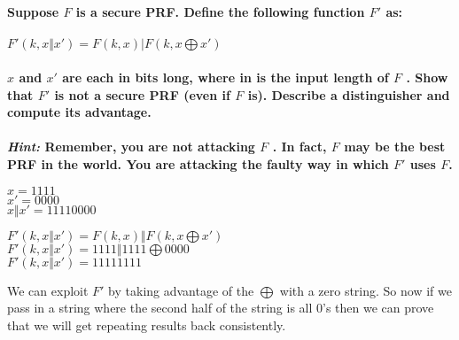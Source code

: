 \documentclass[letterpaper,12pt,notitlepage,fleqn]{article}
\begin{document}
\section{}
\textbf{Suppose $F$ is a secure PRF. Define the following function $F'$ as:\\ \\ $F'(k,x \Vert x')=F(k,x) \vert F(k,x \bigoplus x')$}\\\\
\textbf{$x$ and $x'$ are each in bits long, where in is the input length of $F$ . Show that $F'$ is \textbf{not} a secure PRF (even if $F$ is). Describe a distinguisher and compute its advantage.\\ \\
\textit{Hint:} Remember, you are not attacking $F$ . In fact, $F$ may be the best PRF in the world. You
are attacking the faulty way in which $F'$ uses $F$.}
\begin{multicols}{2}
\begin{center}
$x = 1111$ \\
$x' = 0000$ \\
$x \Vert x' = 11110000$
\end{center}
\columnbreak
$F'(k,x \Vert x')=F(k,x) \Vert F(k,x \bigoplus x')$ \\
$F'(k,x \Vert x')=1111 \Vert 1111 \bigoplus 0000$\\
$F'(k,x \Vert x')=1111 1111$
\end{multicols}
We can exploit $F'$ by taking advantage of the $\bigoplus$ with a zero string. So now if we pass in a string where the second half of the string is all $0$'s then we can prove that we will get repeating results back consistently.
	
\end{document}

